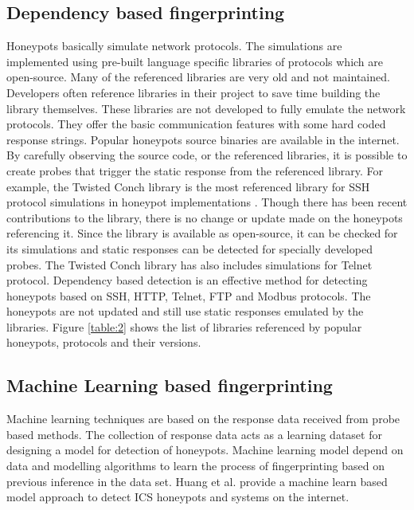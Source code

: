 \documentclass[letterpaper, 10 pt, conference]{ieeeconf}  %
\begin{document}
\subsection{Dependency based fingerprinting}
Honeypots basically simulate network protocols. The simulations are implemented using pre-built language specific libraries of protocols which are open-source. Many of the referenced libraries are very old and not maintained. Developers often reference libraries in their project to save time building the library themselves. These libraries are not developed to fully emulate the network protocols. They offer the basic communication features with some hard coded response strings. Popular honeypots source binaries are available in the internet. By carefully observing the source code, or the referenced libraries, it is possible to create probes that trigger the static response from the referenced library. For example, the Twisted Conch\cite{twisted}  library is the most referenced library for SSH protocol simulations in honeypot implementations \cite{counting}. Though there has been recent contributions to the library, there is no change or update made on the honeypots referencing it. Since the library is available as open-source, it can be checked for its simulations and static responses can be detected for specially developed probes. The Twisted Conch library has also includes simulations for Telnet protocol. Dependency based detection is an effective method for detecting honeypots based on SSH, HTTP, Telnet, FTP and Modbus protocols. The honeypots are not updated and still use static responses emulated by the libraries. Figure \ref{table:2} \cite{Vetterl2018} shows the list of libraries referenced by popular honeypots, protocols and their versions. 



\subsection{Machine Learning based fingerprinting}
Machine learning techniques are based on the response data received from probe based methods. The collection of response data acts as a learning dataset for designing a model for detection of honeypots. Machine learning model depend on data and modelling algorithms to learn the process of fingerprinting based on previous inference in the data set. Huang et al. \cite{huang} provide a machine learn based model approach to detect ICS honeypots and systems on the internet.   
\end{document}
